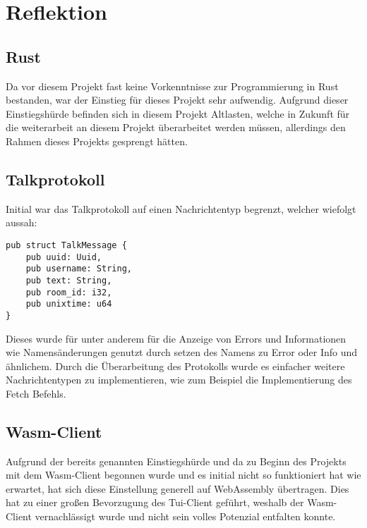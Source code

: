 \chapter{Reflektion}
\section{Rust}
Da vor diesem Projekt fast keine Vorkenntnisse zur Programmierung in Rust bestanden, war der Einstieg für dieses Projekt sehr aufwendig. Aufgrund dieser Einstiegshürde befinden sich in diesem Projekt Altlasten, welche in Zukunft für die weiterarbeit an diesem Projekt überarbeitet werden müssen, allerdings den Rahmen dieses Projekts gesprengt hätten.

\section{Talkprotokoll}
Initial war das Talkprotokoll auf einen Nachrichtentyp begrenzt, welcher wiefolgt aussah:

\begin{lstlisting}[caption=Altes Kommunikationsprotokoll, label=Altes_Kommunikationsprotokoll, basicstyle=\ttfamily\scriptsize]
pub struct TalkMessage {
    pub uuid: Uuid,
    pub username: String,
    pub text: String,
    pub room_id: i32,
    pub unixtime: u64
}
\end{lstlisting}
Dieses wurde für unter anderem für die Anzeige von Errors und Informationen wie Namensänderungen genutzt durch setzen des Namens zu Error oder Info und ähnlichem. Durch die Überarbeitung des Protokolls wurde es einfacher weitere Nachrichtentypen zu implementieren, wie zum Beispiel die Implementierung des Fetch Befehls.

\section{Wasm-Client}
Aufgrund der bereits genannten Einstiegshürde und da zu Beginn des Projekts mit dem Wasm-Client begonnen wurde und es initial nicht so funktioniert hat wie erwartet, hat sich diese Einstellung generell auf WebAssembly übertragen. Dies hat zu einer großen Bevorzugung des Tui-Client geführt, weshalb der Wasm-Client vernachlässigt wurde und nicht sein volles Potenzial entfalten konnte.
